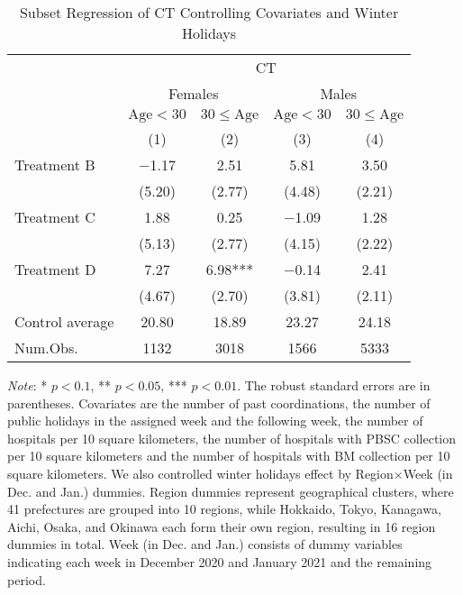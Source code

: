 \documentclass[12pt, a4paper]{article}
\begin{document}
\begin{table}[H]

\caption{\label{tab:test-lm-subset3}Subset Regression of CT Controlling Covariates and Winter Holidays}
\centering
\fontsize{8}{10}\selectfont
\begin{threeparttable}
\begin{tabular}[t]{lcccc}
\toprule
\multicolumn{1}{c}{ } & \multicolumn{4}{c}{CT} \\
\cmidrule(l{3pt}r{3pt}){2-5}
\multicolumn{1}{c}{ } & \multicolumn{2}{c}{Females} & \multicolumn{2}{c}{Males} \\
\cmidrule(l{3pt}r{3pt}){2-3} \cmidrule(l{3pt}r{3pt}){4-5}
\multicolumn{1}{c}{ } & \multicolumn{1}{c}{$\text{Age} < 30$} & \multicolumn{1}{c}{$30 \le \text{Age}$} & \multicolumn{1}{c}{$\text{Age} < 30$} & \multicolumn{1}{c}{$30 \le \text{Age}$} \\
\cmidrule(l{3pt}r{3pt}){2-2} \cmidrule(l{3pt}r{3pt}){3-3} \cmidrule(l{3pt}r{3pt}){4-4} \cmidrule(l{3pt}r{3pt}){5-5}
  & (1) & (2) & (3) & (4)\\
\midrule
Treatment B & \num{-1.17} & \num{2.51} & \num{5.81} & \num{3.50}\\
 & (\num{5.20}) & (\num{2.77}) & (\num{4.48}) & (\num{2.21})\\
Treatment C & \num{1.88} & \num{0.25} & \num{-1.09} & \num{1.28}\\
 & (\num{5.13}) & (\num{2.77}) & (\num{4.15}) & (\num{2.22})\\
Treatment D & \num{7.27} & \num{6.98}*** & \num{-0.14} & \num{2.41}\\
 & (\num{4.67}) & (\num{2.70}) & (\num{3.81}) & (\num{2.11})\\
\midrule
Control average & 20.80 & 18.89 & 23.27 & 24.18\\
Num.Obs. & \num{1132} & \num{3018} & \num{1566} & \num{5333}\\
\bottomrule
\end{tabular}
\begin{tablenotes}
\item \emph{Note}: * $p < 0.1$, ** $p < 0.05$, *** $p < 0.01$. The robust standard errors are in parentheses. Covariates are the number of past coordinations, the number of public holidays in the assigned week and the following week, the number of hospitals per 10 square kilometers, the number of hospitals with PBSC collection per 10 square kilometers and the number of hospitals with BM collection per 10 square kilometers. We also controlled winter holidays effect by Region$\times$Week (in Dec. and Jan.) dummies. Region dummies represent geographical clusters, where 41 prefectures are grouped into 10 regions, while Hokkaido, Tokyo, Kanagawa, Aichi, Osaka, and Okinawa each form their own region, resulting in 16 region dummies in total. Week (in Dec. and Jan.) consists of dummy variables indicating each week in December 2020 and January 2021 and the remaining period.
\end{tablenotes}
\end{threeparttable}
\end{table}
\end{document}
